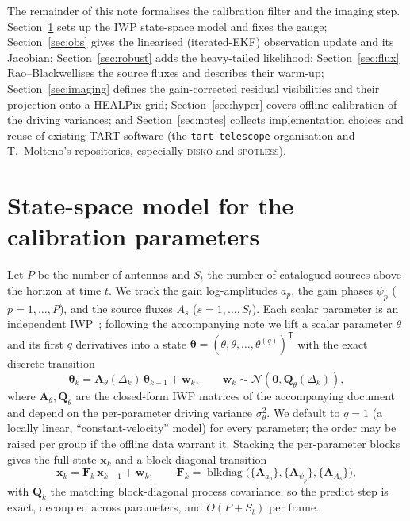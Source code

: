 \documentclass[11pt]{article}
\newcommand{\Norm}{\mathcal{N}}
\newcommand{\T}{^{\mathsf{T}}}
\begin{document}
The remainder of this note formalises the calibration filter and the imaging step. Section~\ref{sec:statespace} sets up the IWP state-space model and fixes the gauge; Section~\ref{sec:obs} gives the linearised (iterated-EKF) observation update and its Jacobian; Section~\ref{sec:robust} adds the heavy-tailed likelihood; Section~\ref{sec:flux} Rao--Blackwellises the source fluxes and describes their warm-up; Section~\ref{sec:imaging} defines the gain-corrected residual visibilities and their projection onto a HEALPix grid; Section~\ref{sec:hyper} covers offline calibration of the driving variances; and Section~\ref{sec:notes} collects implementation choices and reuse of existing TART software (the \texttt{tart-telescope} organisation and T.~Molteno's repositories, especially \textsc{disko} and \textsc{spotless}).

\section{State-space model for the calibration parameters}
\label{sec:statespace}

Let $P$ be the number of antennas and $S_t$ the number of catalogued sources above the
horizon at time $t$. We track the gain log-amplitudes $a_p$, the gain phases $\psi_p$
($p=1,\dots,P$), and the source fluxes $A_s$ ($s=1,\dots,S_t$). Each scalar parameter is an
independent IWP~\cite{sarkka}; following the accompanying note we lift a scalar parameter $\theta$ and
its first $q$ derivatives into a state $\bm{\theta}=(\theta,\dot\theta,\dots,\theta^{(q)})\T$
with the exact discrete transition
\begin{equation}
  \bm{\theta}_k = \bm{A}_\theta(\Delta_k)\,\bm{\theta}_{k-1}+\bm{w}_k,
  \qquad \bm{w}_k\sim\Norm(\bm 0,\bm{Q}_\theta(\Delta_k)),
\end{equation}
where $\bm{A}_\theta,\bm{Q}_\theta$ are the closed-form IWP matrices of the accompanying
document and depend on the per-parameter driving variance $\sigma_\theta^2$. We default to
$q=1$ (a locally linear, ``constant-velocity'' model) for every parameter; the order may be
raised per group if the offline data warrant it. Stacking the per-parameter blocks gives the
full state $\bm{x}_k$ and a block-diagonal transition
\begin{equation}
  \bm{x}_k=\bm{F}_k\,\bm{x}_{k-1}+\bm{w}_k,
  \qquad \bm{F}_k=\operatorname{blkdiag}\big(\{\bm{A}_{a_p}\},\{\bm{A}_{\psi_p}\},\{\bm{A}_{A_s}\}\big),
\end{equation}
with $\bm{Q}_k$ the matching block-diagonal process covariance, so the predict step is exact,
decoupled across parameters, and $O(P+S_t)$ per frame.
\end{document}
